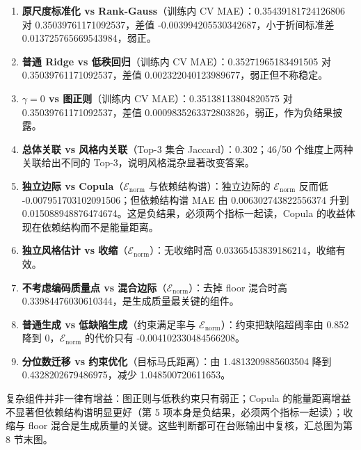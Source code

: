 \documentclass[
  11pt,
]{article}
\providecommand{\tightlist}{%
  \setlength{\itemsep}{0pt}\setlength{\parskip}{0pt}}
\begin{document}
\begin{enumerate}
\def\labelenumi{\arabic{enumi}.}
\tightlist
\item
  \textbf{原尺度标准化 vs Rank-Gauss}（训练内 CV
  MAE）：0.35439181724126806 对 0.35039761171092537，差值
  -0.003994205530342687，小于折间标准差 0.013725765669543984，弱正。
\item
  \textbf{普通 Ridge vs 低秩回归}（训练内 CV MAE）：0.35271965183491505
  对 0.35039761171092537，差值 0.002322040123989677，弱正但不称稳定。
\item
  \textbf{\(\gamma=0\) vs 图正则}（训练内 CV MAE）：0.35138113804820575
  对 0.35039761171092537，差值
  0.0009835263372803826，弱正，作为负结果披露。
\item
  \textbf{总体关联 vs 风格内关联}（Top-3 集合 Jaccard）：0.302；46/50
  个维度上两种关联给出不同的 Top-3，说明风格混杂显著改变答案。
\item
  \textbf{独立边际 vs Copula}（\(\mathcal E_{\mathrm{norm}}\)
  与依赖结构谱）：独立边际的 \(\mathcal E_{\mathrm{norm}}\) 反而低
  -0.007951703102091506；但依赖结构谱 MAE 由 0.006302743822556374 升到
  0.015088948876474674。这是负结果，必须两个指标一起读，Copula
  的收益体现在依赖结构而不是能量距离。
\item
  \textbf{独立风格估计 vs
  收缩}（\(\mathcal E_{\mathrm{norm}}\)）：无收缩时高
  0.03365453839186214，收缩有效。
\item
  \textbf{不考虑编码质量点 vs
  混合边际}（\(\mathcal E_{\mathrm{norm}}\)）：去掉 floor 混合时高
  0.33984476030610344，是生成质量最关键的组件。
\item
  \textbf{普通生成 vs 低缺陷生成}（约束满足率与
  \(\mathcal E_{\mathrm{norm}}\)）：约束把缺陷超阈率由 0.852 降到
  0，\(\mathcal E_{\mathrm{norm}}\) 的代价只有 -0.004102330484566208。
\item
  \textbf{分位数迁移 vs 约束优化}（目标马氏距离）：由 1.4813209885603504
  降到 0.4328202679486975，减少 1.048500720611653。
\end{enumerate}

复杂组件并非一律有增益：图正则与低秩约束只有弱正；Copula
的能量距离增益不显著但依赖结构谱明显更好（第 5
项本身是负结果，必须两个指标一起读）；收缩与 floor
混合是生成质量的关键。这些判断都可在台账输出中复核，汇总图为第 8
节末图。
\end{document}
